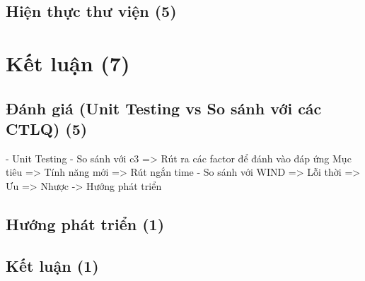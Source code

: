\documentclass[12pt,a4paper]{article}
\begin{document}
\subsection{Hiện thực thư viện (5)}
\newpage
\section{Kết luận (7)}
\subsection{Đánh giá (Unit Testing vs So sánh với các CTLQ) (5)}
- Unit Testing
- So sánh với c3 => Rút ra các factor để đánh vào đáp ứng Mục tiêu => Tính năng mới => Rút ngắn time
- So sánh với WIND => Lỗi thời
=> Ưu
=> Nhược -> Hướng phát triển
\subsection{Hướng phát triển (1)}
\subsection{Kết luận (1)}
\newpage



\end{document}

